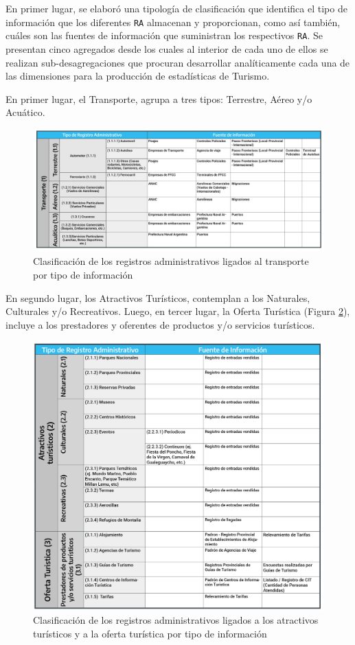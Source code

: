 \documentclass[
]{book}
\begin{document}
En primer lugar, se elaboró una tipología de clasificación que identifica el tipo de información que los diferentes \texttt{RA} almacenan y proporcionan, como así también, cuáles son las fuentes de información que suministran los respectivos \texttt{RA}. Se presentan cinco agregados desde los cuales al interior de cada uno de ellos se realizan sub-desagregaciones que procuran desarrollar analíticamente cada una de las dimensiones para la producción de estadísticas de Turismo.

En primer lugar, el Transporte, agrupa a tres tipos: Terrestre, Aéreo y/o Acuático.

\begin{figure}

{\centering \includegraphics[width=0.8\linewidth]{imagenes/figura03A} 

}

\caption{Clasificación de los registros administrativos ligados al transporte por tipo de información}\label{fig:clasificaciontransporte}
\end{figure}

En segundo lugar, los Atractivos Turísticos, contemplan a los Naturales, Culturales y/o Recreativos. Luego, en tercer lugar, la Oferta Turística (Figura \ref{fig:clasificacionatractivos}), incluye a los prestadores y oferentes de productos y/o servicios turísticos.

\begin{figure}

{\centering \includegraphics[width=0.8\linewidth]{imagenes/figura03B} 

}

\caption{Clasificación de los registros administrativos ligados a los atractivos turísticos y a la oferta turística por tipo de información}\label{fig:clasificacionatractivos}
\end{figure}
\end{document}
